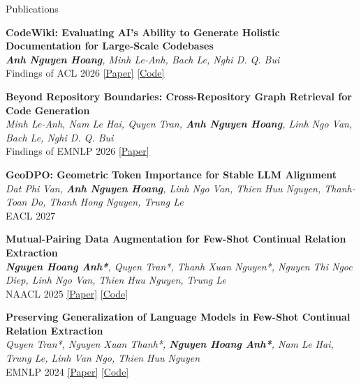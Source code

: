 \documentclass{resume} %
\begin{document}
\begin{rSection}{Publications}

\begin{enumerate}[leftmargin=1.8em,label={[\arabic*]},itemsep=0.1em,topsep=0.1em]

    \item
    \textbf{CodeWiki: Evaluating AI's Ability to Generate Holistic Documentation
    for Large-Scale Codebases}\\
    \textit{\textbf{Anh Nguyen Hoang}, Minh Le-Anh, Bach Le, Nghi D. Q. Bui}\\
    Findings of ACL 2026
    \href{https://arxiv.org/abs/2510.24428}{[Paper]}
    \href{https://github.com/FSoft-AI4Code/CodeWiki}{[Code]}

    \item
    \textbf{Beyond Repository Boundaries: Cross-Repository Graph Retrieval
    for Code Generation}\\
    \textit{Minh Le-Anh, Nam Le Hai, Quyen Tran, \textbf{Anh Nguyen Hoang},
    Linh Ngo Van, Bach Le, Nghi D. Q. Bui}\\
    Findings of EMNLP 2026
    \href{https://arxiv.org/abs/2609.09987}{[Paper]}

    \item
    \textbf{GeoDPO: Geometric Token Importance for Stable LLM Alignment}\\
    \textit{Dat Phi Van, \textbf{Anh Nguyen Hoang}, Linh Ngo Van, Thien Huu Nguyen,
    Thanh-Toan Do, Thanh Hong Nguyen, Trung Le}\\
    EACL 2027

    \item
    \textbf{Mutual-Pairing Data Augmentation for Few-Shot Continual Relation Extraction}\\
    \textit{\textbf{Nguyen Hoang Anh*}, Quyen Tran*, Thanh Xuan Nguyen*,
    Nguyen Thi Ngoc Diep, Linh Ngo Van, Thien Huu Nguyen, Trung Le}\\
    NAACL 2025
    \href{https://aclanthology.org/2025.naacl-long.205/}{[Paper]}
    \href{https://github.com/anhnh2002/mutual-pairing-data-augmentation}{[Code]}

    \item
    \textbf{Preserving Generalization of Language Models in Few-Shot Continual
    Relation Extraction}\\
    \textit{Quyen Tran*, Nguyen Xuan Thanh*, \textbf{Nguyen Hoang Anh*},
    Nam Le Hai, Trung Le, Linh Van Ngo, Thien Huu Nguyen}\\
    EMNLP 2024
    \href{https://aclanthology.org/2024.emnlp-main.763/}{[Paper]}
    \href{https://github.com/thanhnx12/CRE-via-MMI}{[Code]}


\end{enumerate}
\end{rSection}
\end{document}

